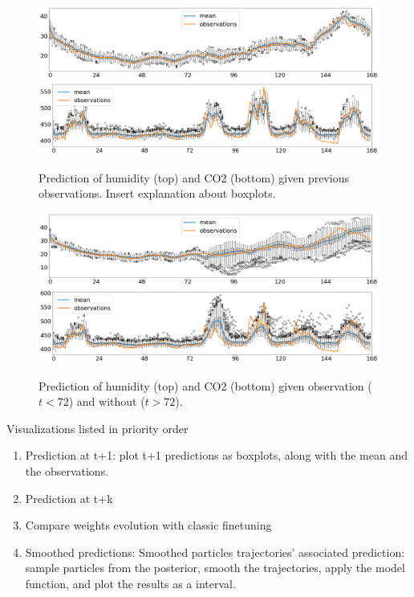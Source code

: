 \documentclass{article}
\begin{document}
\begin{figure}[htpb]
	\centering
	\includegraphics[width=\linewidth]{filter_kp1_hum.png}
	\includegraphics[width=\linewidth]{filter_kp1_co2.png}
	\caption{Prediction of humidity (top) and CO2 (bottom) given previous observations. Insert explanation about boxplots.}%
	\label{fig:filter_k+1}
\end{figure}

\begin{figure}[htpb]
	\centering
	\includegraphics[width=\linewidth]{filter_kp24_hum.png}
	\includegraphics[width=\linewidth]{filter_kp24_co2.png}
	\caption{Prediction of humidity (top) and CO2 (bottom) given observation ($t<72$) and without ($t > 72$).}%
	\label{fig:filter_k+24}
\end{figure}

Visualizations listed in priority order
\begin{enumerate}
	\item Prediction at t+1: plot t+1 predictions as boxplots, along with the mean and the observations.
	\item Prediction at t+k
	\item Compare weights evolution with classic finetuning
	\item Smoothed predictions: Smoothed particles trajectories' associated prediction: sample particles from the posterior, smooth the trajectories, apply the model function, and plot the results as a interval.
\end{enumerate}
\end{document}
